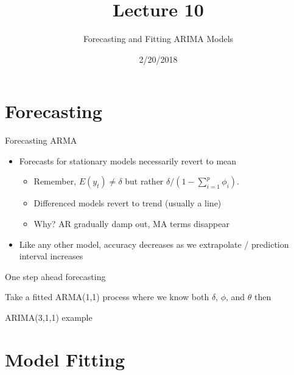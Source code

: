 \documentclass[11pt,ignorenonframetext,]{beamer}
\title{Lecture 10}
\subtitle{Forecasting and Fitting ARIMA Models}
\date{2/20/2018}
\begin{document}
\frame{\titlepage}

\hypertarget{forecasting}{%
\section{Forecasting}\label{forecasting}}

\begin{frame}[t]{%
\protect\hypertarget{forecasting-arma}{%
Forecasting ARMA}}

\begin{itemize}
\item
  Forecasts for stationary models necessarily revert to mean

  \begin{itemize}
  \item
    Remember, \(E(y_t) \ne \delta\) but rather
    \(\delta / (1 - \sum_{i=1}^p \phi_i)\).
  \item
    Differenced models revert to trend (usually a line)
  \item
    Why? AR gradually damp out, MA terms disappear
  \end{itemize}
\item
  Like any other model, accuracy decreases as we extrapolate /
  prediction interval increases
\end{itemize}

\end{frame}

\begin{frame}[t]{%
\protect\hypertarget{one-step-ahead-forecasting}{%
One step ahead forecasting}}

Take a fitted ARMA(1,1) process where we know both \(\delta\), \(\phi\),
and \(\theta\) then

\end{frame}

\begin{frame}{%
\protect\hypertarget{arima311-example}{%
ARIMA(3,1,1) example}}

\end{frame}

\hypertarget{model-fitting}{%
\section{Model Fitting}\label{model-fitting}}
\end{document}
